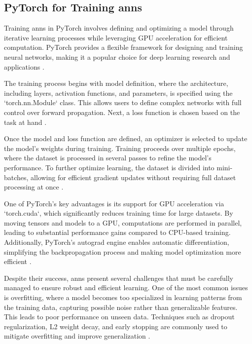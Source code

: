 \subsection{PyTorch for Training \ac{ann}s} \label{sec:pytorch}

Training \ac{ann}s in PyTorch involves defining and optimizing a model through iterative learning processes while leveraging GPU acceleration for efficient computation.
PyTorch provides a flexible framework for designing and training neural networks, making it a popular choice for deep learning research and applications \cite{pytorchPyTorch}.

The training process begins with model definition, where the architecture, including layers, activation functions, and parameters, is specified using the `torch.nn.Module` class.
This allows users to define complex networks with full control over forward propagation.
Next, a loss function is chosen based on the task at hand \cite{pytorchPyTorch}.

Once the model and loss function are defined, an optimizer is selected to update the model’s weights during training.
Training proceeds over multiple epochs, where the dataset is processed in several passes to refine the model’s performance.
To further optimize learning, the dataset is divided into mini-batches, allowing for efficient gradient updates without requiring full dataset processing at once \cite{pytorchPyTorch}.

One of PyTorch’s key advantages is its support for GPU acceleration via `torch.cuda`, which significantly reduces training time for large datasets.
By moving tensors and models to a GPU, computations are performed in parallel, leading to substantial performance gains compared to CPU-based training.
Additionally, PyTorch's autograd engine enables automatic differentiation, simplifying the backpropagation process and making model optimization more efficient \cite{pytorchPyTorch}.

Despite their success, \ac{ann}s present several challenges that must be carefully managed to ensure robust and efficient learning.
One of the most common issues is overfitting, where a model becomes too specialized in learning patterns from the training data, capturing possible noise rather than generalizable features.
This leads to poor performance on unseen data.
Techniques such as dropout regularization, L2 weight decay, and early stopping are commonly used to mitigate overfitting and improve generalization \cite{pytorchPyTorch,glorot2010understanding}.

